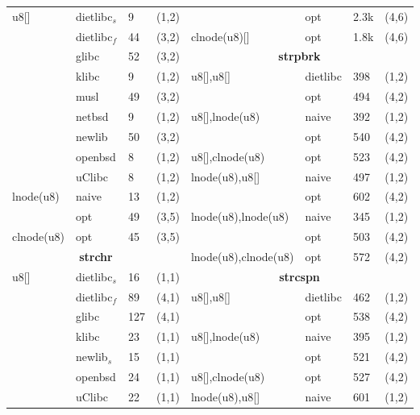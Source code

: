 \begin{table}[H]
\begin{center}
\begin{scriptsize}
\begin{tabular}{@{}l@{\hspace{5px}}l@{\hspace{5px}}l@{\hspace{5px}}cl@{\hspace{5px}}l@{\hspace{5px}}l@{\hspace{5px}}c@{}}
u8[] & dietlibc$_s$ & 9 & (1,2) &             & opt & 2.3k & (4,6) \\
       & dietlibc$_f$ & 44 & (3,2) &           clnode(u8)[] & opt & 1.8k & (4,6) \\
       & glibc & 52 & (3,2) &                                \multicolumn{4}{c}{\bf strpbrk} \\
       & klibc & 9 & (1,2) &                                 u8[],u8[] & dietlibc & 398 & (1,2) \\
       & musl & 49 & (3,2) &                                 & opt      & 494 & (4,2) \\
       & netbsd & 9 & (1,2) &                                u8[],lnode(u8) & naive & 392 & (1,2) \\
       & newlib & 50 & (3,2) &                               & opt & 540 & (4,2) \\
       & openbsd & 8 & (1,2) &                               u8[],clnode(u8) & opt & 523 & (4,2) \\
       & uClibc & 8 & (1,2) &                                lnode(u8),u8[] & naive & 497 & (1,2) \\
lnode(u8) & naive & 13 & (1,2) &                             & opt & 602 & (4,2) \\
            & opt & 49 & (3,5) &                             lnode(u8),lnode(u8) & naive & 345 & (1,2) \\
clnode(u8) & opt & 45 & (3,5) &                              & opt & 503 & (4,2) \\
 \multicolumn{4}{c}{\bf strchr} &                            lnode(u8),clnode(u8) & opt & 572 & (4,2) \\
u8[] & dietlibc$_s$ & 16 & (1,1) &            \multicolumn{4}{c}{\bf strcspn} \\
       & dietlibc$_f$ & 89 & (4,1) &           u8[],u8[] & dietlibc & 462 & (1,2) \\
       & glibc & 127 & (4,1) &                               & opt      & 538 & (4,2) \\
       & klibc & 23 & (1,1) &                                u8[],lnode(u8) & naive & 395 & (1,2) \\
       & newlib$_s$ & 15 & (1,1) &            & opt & 521 & (4,2) \\
       & openbsd & 24 & (1,1) &                              u8[],clnode(u8) & opt & 527 & (4,2) \\
       & uClibc & 22 & (1,1) &                               lnode(u8),u8[] & naive & 601 & (1,2) \\

\end{tabular}
\end{scriptsize}
\end{center}
\end{table}
